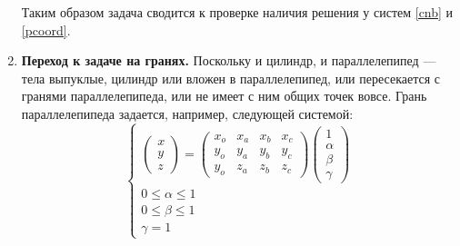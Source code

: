 \documentclass[pdftex,ptm,12pt,a4paper]{report}
\begin{document}
\begin{enumerate}
      Таким образом задача сводится к проверке наличия решения у систем \ref{cnb} и \ref{pcoord}.
  \item
    \textbf{Переход к задаче на гранях.}
    Поскольку и цилиндр, и параллелепипед --- тела выпуклые, цилиндр или вложен в параллелепипед, или пересекается с гранями параллелепипеда, или не имеет с ним общих точек вовсе.
    Грань параллелепипеда задается, например, следующей системой:
    \begin{equation}\label{planecoord}
      \begin{cases}
        \begin{pmatrix} x \\ y \\ z \end{pmatrix}            
        =
        \begin{pmatrix} x_o & x_a & x_b & x_c \\ y_o & y_a & y_b & y_c  \\ y_o & z_a & z_b & z_c 
        \end{pmatrix} \begin {pmatrix} 1 \\ \alpha \\ \beta \\ \gamma \end{pmatrix} \\
        0 \le  \alpha   \le  1 \\
        0 \le  \beta   \le  1 \\
        \gamma   =  1 
      \end{cases}
    \end{equation}
    

\end{enumerate}
\end{document}
